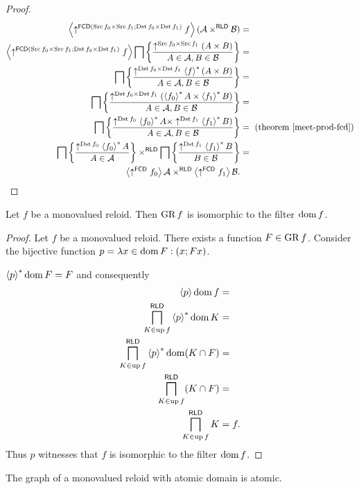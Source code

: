 \begin{proof}
~
\begin{align*}
\left\langle \uparrow^{\mathsf{FCD}(\operatorname{Src} f_{0}\times\operatorname{Src} f_{1};\operatorname{Dst} f_{0}\times\operatorname{Dst} f_{1})}f\right\rangle(\mathcal{A}\times^{\mathsf{RLD}}\mathcal{B}) & =\\
\left\langle \uparrow^{\mathsf{FCD}(\operatorname{Src} f_{0}\times\operatorname{Src} f_{1};\operatorname{Dst} f_{0}\times\operatorname{Dst} f_{1})}f\right\rangle\bigsqcap\left\{ \frac{\uparrow^{\operatorname{Src} f_{0}\times\operatorname{Src} f_{1}}(A\times B)}{A\in\mathcal{A},B\in\mathcal{B}}\right\} & =\\
\bigsqcap\left\{ \frac{\uparrow^{\operatorname{Dst} f_{0}\times\operatorname{Dst} f_{1}}\left\langle f\right\rangle ^{\ast}(A\times B)}{A\in\mathcal{A},B\in\mathcal{B}}\right\} & =\\
\bigsqcap\left\{ \frac{\uparrow^{\operatorname{Dst} f_{0}\times\operatorname{Dst} f_{1}}(\left\langle f_{0}\right\rangle ^{\ast}A\times\left\langle f_{1}\right\rangle ^{\ast}B)}{A\in\mathcal{A},B\in\mathcal{B}}\right\} & =\\
\bigsqcap\left\{ \frac{\uparrow^{\operatorname{Dst} f_{0}}\left\langle f_{0}\right\rangle ^{\ast}A\times\uparrow^{\operatorname{Dst} f_{1}}\left\langle f_{1}\right\rangle ^{\ast}B)}{A\in\mathcal{A},B\in\mathcal{B}}\right\} & =\text{ (theorem \ref{meet-prod-fcd})}\\
\bigsqcap\left\{ \frac{\uparrow^{\operatorname{Dst} f_{0}}\left\langle f_{0}\right\rangle ^{\ast}A}{A\in\mathcal{A}}\right\}\times^{\mathsf{RLD}}\bigsqcap\left\{ \frac{\uparrow^{\operatorname{Dst} f_{1}}\left\langle f_{1}\right\rangle ^{\ast}B}{B\in\mathcal{B}}\right\} & =\\
\left\langle \uparrow^{\mathsf{FCD}}f_{0}\right\rangle\mathcal{A}\times^{\mathsf{RLD}}\left\langle \uparrow^{\mathsf{FCD}}f_{1}\right\rangle\mathcal{B}.
\end{align*}
\end{proof}
\begin{thm}
\label{inj-iso-dom}Let $f$ be a monovalued reloid. Then $\operatorname{GR} f$
is isomorphic to the filter $\operatorname{dom} f$.\end{thm}
\begin{proof}
Let $f$ be a monovalued reloid. There exists a function $F\in\operatorname{GR} f$.
Consider the bijective function $p=\lambda x\in\operatorname{dom} F:(x;Fx)$.

$\left\langle p\right\rangle ^{\ast}\operatorname{dom} F=F$ and consequently
\begin{align*}
\left\langle p\right\rangle\operatorname{dom} f & =\\
\bigsqcap_{K\in\operatorname{up} f}^{\mathsf{RLD}}\left\langle p\right\rangle ^{\ast}\operatorname{dom} K & =\\
\bigsqcap_{K\in\operatorname{up} f}^{\mathsf{RLD}}\left\langle p\right\rangle ^{\ast}\operatorname{dom}(K\cap F) & =\\
\bigsqcap_{K\in\operatorname{up} f}^{\mathsf{RLD}}(K\cap F) & =\\
\bigsqcap_{K\in\operatorname{up} f}^{\mathsf{RLD}}K & =f.
\end{align*}
Thus $p$ witnesses that $f$ is isomorphic to the filter $\operatorname{dom} f$.\end{proof}
\begin{cor}
The graph of a monovalued reloid with atomic domain is atomic.
\end{cor}

